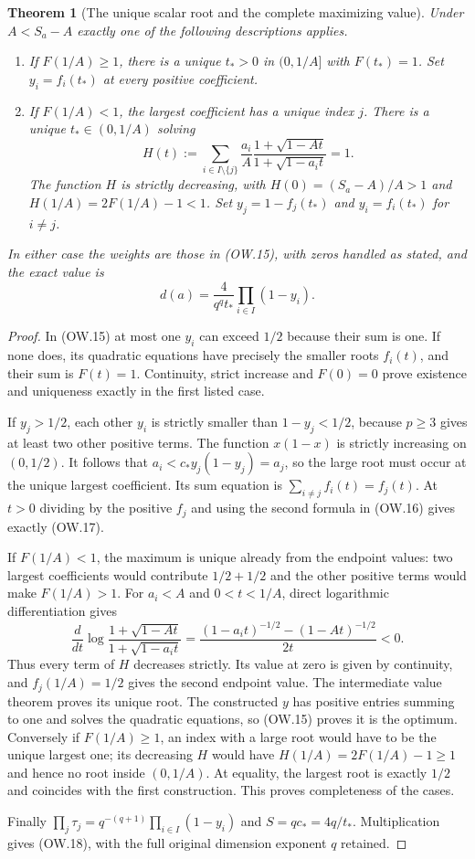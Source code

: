 \documentclass[11pt]{article}
\newtheorem{theorem}{Theorem}[section]
\begin{document}
\begin{theorem}[The unique scalar root and the complete maximizing value]
Under $A<S_a-A$ exactly one of the following descriptions applies.
\begin{enumerate}
\item If $F(1/A)\ge1$, there is a unique $t_*>0$ in $(0,1/A]$
with $F(t_*)=1$. Set $y_i=f_i(t_*)$ at every positive coefficient.
\item If $F(1/A)<1$, the largest coefficient has a unique index $j$.
There is a unique $t_*\in(0,1/A)$ solving
\[
 H(t):=\sum_{i\in I\setminus\{j\}}\frac{a_i}{A}
   \frac{1+\sqrt{1-At}}{1+\sqrt{1-a_it}}=1.               \tag{OW.17}
\]
The function $H$ is strictly decreasing, with
$H(0)=(S_a-A)/A>1$ and $H(1/A)=2F(1/A)-1<1$.
Set $y_j=1-f_j(t_*)$ and $y_i=f_i(t_*)$ for $i\ne j$.
\end{enumerate}
In either case the weights are those in (OW.15), with zeros handled
as stated, and the exact value is
\[
 \boxed{d(a)=\frac{4}{q^qt_*}\prod_{i\in I}(1-y_i).}     \tag{OW.18}
\]
\end{theorem}
\begin{proof}
In (OW.15) at most one $y_i$ can exceed $1/2$ because their sum
is one. If none does, its quadratic equations have precisely the
smaller roots $f_i(t)$, and their sum is $F(t)=1$.
Continuity, strict increase and $F(0)=0$ prove existence and
uniqueness exactly in the first listed case.

If $y_j>1/2$, each other $y_i$ is strictly smaller than
$1-y_j<1/2$, because $p\ge3$ gives at least two other positive
terms. The function $x(1-x)$ is strictly increasing on $(0,1/2)$.
It follows that $a_i<c_*y_j(1-y_j)=a_j$, so the large root must
occur at the unique largest coefficient. Its sum equation is
$\sum_{i\ne j}f_i(t)=f_j(t)$. At $t>0$ dividing by the positive
$f_j$ and using the second formula in (OW.16) gives exactly (OW.17).

If $F(1/A)<1$, the maximum is unique already from the endpoint
values: two largest coefficients would contribute $1/2+1/2$ and
the other positive terms would make $F(1/A)>1$.
For $a_i<A$ and $0<t<1/A$, direct logarithmic differentiation gives
\[
 \frac d{dt}\log\frac{1+\sqrt{1-At}}{1+\sqrt{1-a_it}}
  =\frac{(1-a_it)^{-1/2}-(1-At)^{-1/2}}{2t}<0.
 \tag{OW.19}
\]
Thus every term of $H$ decreases strictly. Its value at zero is
given by continuity, and $f_j(1/A)=1/2$ gives the second endpoint
value. The intermediate value theorem proves its unique root.
The constructed $y$ has positive entries summing to one and solves
the quadratic equations, so (OW.15) proves it is the optimum.
Conversely if $F(1/A)\ge1$, an index with a large root would
have to be the unique largest one; its decreasing $H$ would have
$H(1/A)=2F(1/A)-1\ge1$ and hence no root inside $(0,1/A)$.
At equality, the largest root is exactly $1/2$ and coincides with
the first construction. This proves completeness of the cases.

Finally $\prod_j\tau_j=q^{-(q+1)}\prod_{i\in I}(1-y_i)$
and $S=q c_*=4q/t_*$. Multiplication gives (OW.18), with the
full original dimension exponent $q$ retained.
\end{proof}
\end{document}
